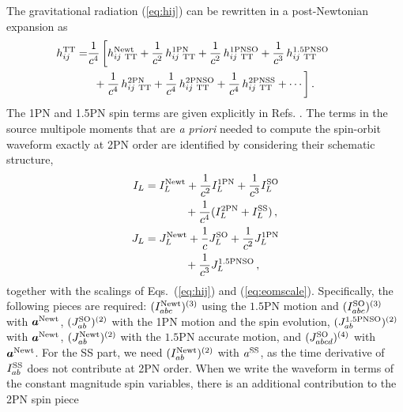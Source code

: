 \documentclass[aps, prd,
twocolumn,%
superscriptaddress,
showpacs, nofootinbib, eqsecnum, amsmath, amssymb, floatfix
]{revtex4}
\begin{document}
The gravitational radiation (\ref{eq:hij}) can be rewritten in a
post-Newtonian expansion as
%
\begin{align}
\label{eq:hexpansion} h_{ij}^{\mathrm{TT}} =&\frac{1}{c^4}\,\bigg[
h^{\rm Newt}_{{ij~{\mathrm{TT}}}} + \frac{1}{c^2}\,h^{\rm
1PN}_{{ij~{\mathrm{TT}}}}+\frac{1}{c^2}\,h^{\rm 1PN SO}_{{ij \
{\mathrm{TT}}}} +
\frac{1}{c^3}\,h^{\rm 1.5PN  SO}_{{ij \   {\mathrm{TT}}}} \hfill ~ \; \; \; \;  \; ~ \; \nonumber \\
& \; \; + \frac{1}{c^4}\,h^{\rm 2PN}_{{ij \   {\mathrm{TT}}}} +
\frac{1}{c^4}\,h^{\rm 2PN  SO}_{{ij \   {\mathrm{TT}}}} +
\frac{1}{c^4}\,h^{\rm 2PN  SS}_{{ij \   {\mathrm{TT}}}} + \cdots\bigg]\,.  
\end{align}
%
The 1PN and 1.5PN spin terms are given explicitly in Refs.
\cite{Kidder:1995zr, Arun:2009}. The terms in the source multipole
moments that are \textit{a priori} needed to compute the spin-orbit
waveform exactly at 2PN order are identified by considering their
schematic structure,
\begin{subequations}
\begin{align} I_{L} &=I_{L}^{\rm Newt}+
\frac{1}{c^2}I_{L}^{\rm 1PN}+\frac{1}{c^3}I_{L}^{\rm SO}\nonumber \\ & \qquad
\quad~~ +
\frac{1}{c^4}(I_{L}^{\rm 2PN}+I_L^{\rm SS}) \,, \label{eq:ulstruct}\\
J_{L}&=J_{L}^{\rm Newt}+\frac{1}{c}J_{L}^{\rm
SO}+\frac{1}{c^2}J_{L}^{\rm 1PN} \nonumber \\ & \qquad
\quad~~ +
\frac{1}{c^3}J_{L}^{\rm 1.5PNSO}\,,
\label{eq:vlstruct}
\end{align}
\end{subequations}
together with the scalings of Eqs.~(\ref{eq:hij}) and
(\ref{eq:eomscale}). Specifically, the following pieces are
required: $(I_{abc}^{\rm Newt})^{(3)}$ using the $1.5$PN motion and
$(I_{abc}^{\rm SO})^{(3)}$ with $\bm{a}^{\rm Newt}$, $(J_{ab}^{\rm
SO})^{(2)}$ with the 1PN motion and the spin evolution, $(J_{ab}^{
\rm 1.5PNSO})^{(2)}$ with $\bm{a}^{\rm Newt}$, $(J_{ab}^{ \rm
Newt})^{(2)}$ with the $1.5$PN accurate motion, and $(J_{abcd}^{\rm
SO})^{(4)}$ with $\bm{a}^{\rm Newt}$. For the SS part, we need
$(I_{ab}^{\rm Newt})^{(2)}$ with $a^{\rm SS}$, as the time
derivative of $I_{ab}^{\rm SS}$ does not contribute at 2PN order.
When we write the waveform in terms of the constant magnitude spin
variables, there is an additional contribution to the 2PN spin piece
\end{document}
